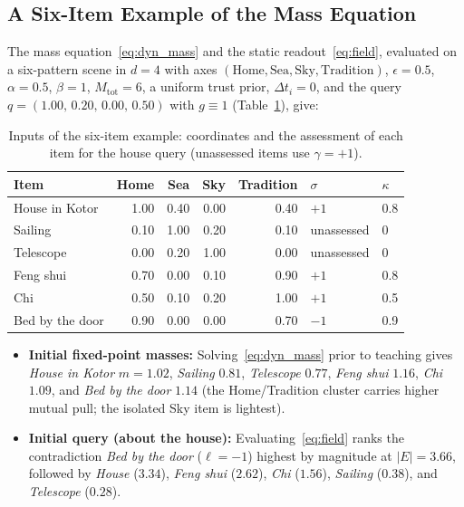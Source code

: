 \documentclass[11pt]{article}
\theoremstyle{remark}
\newcommand{\act}{E}
\begin{document}
\subsection{A Six-Item Example of the Mass Equation}
The mass equation~\eqref{eq:dyn_mass} and the static readout~\eqref{eq:field}, evaluated on a six-pattern scene in $d=4$ with axes $(\text{Home}, \text{Sea}, \text{Sky}, \text{Tradition})$, $\epsilon=0.5$, $\alpha=0.5$, $\beta=1$, $M_{\text{tot}}=6$, a uniform trust prior, $\Delta t_i=0$, and the query $q=(1.00,\,0.20,\,0.00,\,0.50)$ with $g\equiv 1$ (Table~\ref{tab:dynscene}), give:
\begin{table}[htbp]
  \centering
  \caption{Inputs of the six-item example: coordinates and the assessment of each item for the house query (unassessed items use $\gamma=+1$).}
  \label{tab:dynscene}
  \begin{tabular}{@{}lrrrrll@{}}
  \toprule
  Item & Home & Sea & Sky & Tradition & $\sigma$ & $\kappa$ \\
  \midrule
  House in Kotor & 1.00 & 0.40 & 0.00 & 0.40 & $+1$ & 0.8 \\
  Sailing & 0.10 & 1.00 & 0.20 & 0.10 & unassessed & 0 \\
  Telescope & 0.00 & 0.20 & 1.00 & 0.00 & unassessed & 0 \\
  Feng shui & 0.70 & 0.00 & 0.10 & 0.90 & $+1$ & 0.8 \\
  Chi & 0.50 & 0.10 & 0.20 & 1.00 & $+1$ & 0.5 \\
  Bed by the door & 0.90 & 0.00 & 0.00 & 0.70 & $-1$ & 0.9 \\
  \bottomrule
  \end{tabular}
\end{table}
\begin{itemize}
  \item \textbf{Initial fixed-point masses:} Solving~\eqref{eq:dyn_mass} prior to teaching gives \emph{House in Kotor} $m=1.02$, \emph{Sailing} $0.81$, \emph{Telescope} $0.77$, \emph{Feng shui} $1.16$, \emph{Chi} $1.09$, and \emph{Bed by the door} $1.14$ (the Home/Tradition cluster carries higher mutual pull; the isolated Sky item is lightest).
  \item \textbf{Initial query (about the house):} Evaluating~\eqref{eq:field} ranks the contradiction \emph{Bed by the door} ($\ell = -1$) highest by magnitude at $|\act|=3.66$, followed by \emph{House} ($3.34$), \emph{Feng shui} ($2.62$), \emph{Chi} ($1.56$), \emph{Sailing} ($0.38$), and \emph{Telescope} ($0.28$).
\end{itemize}
\end{document}
